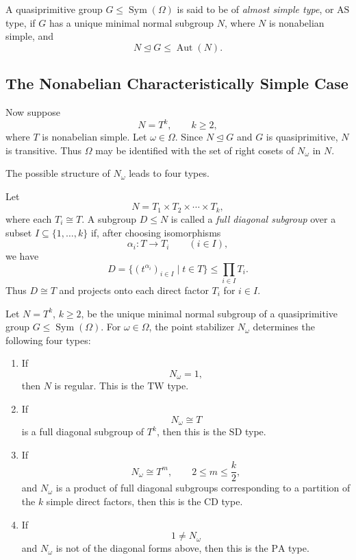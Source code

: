 \begin{definition}[AS type]
A quasiprimitive group \(G\leq \operatorname{Sym}(\Omega)\) is said to be of
\emph{almost simple type}, or \(\mathrm{AS}\) type, if \(G\) has a unique minimal normal
subgroup \(N\), where \(N\) is nonabelian simple, and
\[
    N\unlhd G\leq \operatorname{Aut}(N).
\]
\end{definition}

\subsection{The Nonabelian Characteristically Simple Case}

Now suppose
\[
    N=T^k,\qquad k\geq 2,
\]
where \(T\) is nonabelian simple. Let \(\omega\in\Omega\). Since \(N\unlhd G\) and
\(G\) is quasiprimitive, \(N\) is transitive. Thus \(\Omega\) may be identified with the set of
right cosets of \(N_\omega\) in \(N\).

The possible structure of \(N_\omega\) leads to four types.

\begin{definition}
Let
\[
    N=T_1\times T_2\times \cdots \times T_k,
\]
where each \(T_i\cong T\). A subgroup \(D\leq N\) is called a \emph{full diagonal subgroup}
over a subset \(I\subseteq \{1,\dots,k\}\) if, after choosing isomorphisms
\[
    \alpha_i:T\to T_i\qquad (i\in I),
\]
we have
\[
    D=
    \{(t^{\alpha_i})_{i\in I}\mid t\in T\}
    \leq \prod_{i\in I}T_i.
\]
Thus \(D\cong T\) and projects onto each direct factor \(T_i\) for \(i\in I\).
\end{definition}

\begin{topic}
Let \(N=T^k\), \(k\geq 2\), be the unique minimal normal subgroup of a quasiprimitive
group \(G\leq \operatorname{Sym}(\Omega)\). For \(\omega\in\Omega\), the point stabilizer
\(N_\omega\) determines the following four types:

\begin{enumerate}[label=(\roman*)]
    \item If
    \[
        N_\omega=1,
    \]
    then \(N\) is regular. This is the \(\mathrm{TW}\) type.

    \item If
    \[
        N_\omega\cong T
    \]
    is a full diagonal subgroup of \(T^k\), then this is the \(\mathrm{SD}\) type.

    \item If
    \[
        N_\omega\cong T^m,\qquad 2\leq m\leq \frac{k}{2},
    \]
    and \(N_\omega\) is a product of full diagonal subgroups corresponding to a partition
    of the \(k\) simple direct factors, then this is the \(\mathrm{CD}\) type.

    \item If
    \[
        1\neq N_\omega
    \]
    and \(N_\omega\) is not of the diagonal forms above, then this is the \(\mathrm{PA}\) type.
\end{enumerate}
\end{topic}

